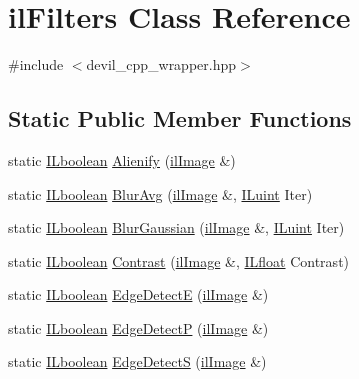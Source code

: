 \hypertarget{classil_filters}{\section{il\-Filters Class Reference}
\label{classil_filters}
}


{\ttfamily \#include $<$devil\-\_\-cpp\-\_\-wrapper.\-hpp$>$}

\subsection*{Static Public Member Functions}
\begin{DoxyCompactItemize}
\item 
static \hyperlink{il_8h_a8be80d75c2c636b9f2250fe10c2e7874}{I\-Lboolean} \hyperlink{classil_filters_aa07915e42c0b30c52a603415f3008e24}{Alienify} (\hyperlink{classil_image}{il\-Image} \&)
\item 
static \hyperlink{il_8h_a8be80d75c2c636b9f2250fe10c2e7874}{I\-Lboolean} \hyperlink{classil_filters_a5d71b7a16add1ab404f682f7dc806e58}{Blur\-Avg} (\hyperlink{classil_image}{il\-Image} \&, \hyperlink{il_8h_ac6508d0e9c19e32f32e00d54b5b8cf30}{I\-Luint} Iter)
\item 
static \hyperlink{il_8h_a8be80d75c2c636b9f2250fe10c2e7874}{I\-Lboolean} \hyperlink{classil_filters_a6d697a60c36478d44845b41d48421b6a}{Blur\-Gaussian} (\hyperlink{classil_image}{il\-Image} \&, \hyperlink{il_8h_ac6508d0e9c19e32f32e00d54b5b8cf30}{I\-Luint} Iter)
\item 
static \hyperlink{il_8h_a8be80d75c2c636b9f2250fe10c2e7874}{I\-Lboolean} \hyperlink{classil_filters_ac43536f8ec4ea45169e1f3c0ed3b6e9f}{Contrast} (\hyperlink{classil_image}{il\-Image} \&, \hyperlink{il_8h_a0576415379485bafa4b5f61989797b5e}{I\-Lfloat} Contrast)
\item 
static \hyperlink{il_8h_a8be80d75c2c636b9f2250fe10c2e7874}{I\-Lboolean} \hyperlink{classil_filters_a7848b20ea4ec80a4393ebcf93d173fe9}{Edge\-Detect\-E} (\hyperlink{classil_image}{il\-Image} \&)
\item 
static \hyperlink{il_8h_a8be80d75c2c636b9f2250fe10c2e7874}{I\-Lboolean} \hyperlink{classil_filters_a8d56f552068de808e4bb5fb2c37c7804}{Edge\-Detect\-P} (\hyperlink{classil_image}{il\-Image} \&)
\item 
static \hyperlink{il_8h_a8be80d75c2c636b9f2250fe10c2e7874}{I\-Lboolean} \hyperlink{classil_filters_ace72e2a0c70b10e46ded94b1193b08e7}{Edge\-Detect\-S} (\hyperlink{classil_image}{il\-Image} \&)
\item 

\end{DoxyCompactItemize}
